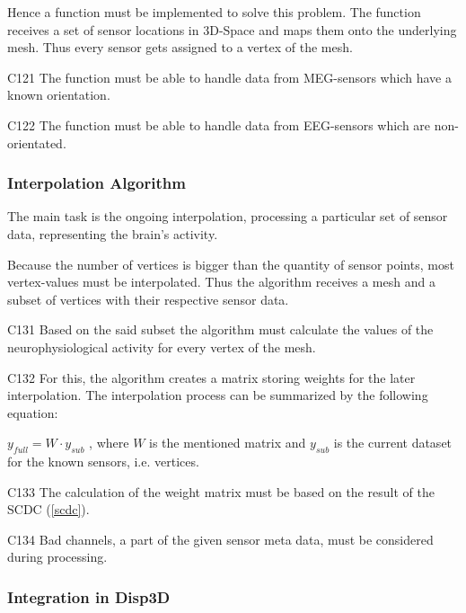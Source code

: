 	Hence a function must be implemented to solve this problem. 
	The function receives a set of sensor locations in 3D-Space and maps them onto the underlying mesh. Thus every 			sensor gets assigned to a vertex of the mesh. 

	\begin{aims}
	
		\item[C121] The function must be able to handle data from MEG-sensors which have a known orientation.
		\item[C122] The function must be able to handle data from EEG-sensors which are non-orientated.
	
	\end{aims}

\subsubsection{Interpolation Algorithm} \label{interpolation} 

	The main task is the ongoing interpolation, processing a particular set of sensor data, representing the brain's 			activity.
	
	Because the number of vertices is bigger than the quantity of sensor points, most vertex-values must be interpolated.
	Thus the algorithm receives a mesh and a subset of vertices with their respective sensor data.  
	
	\begin{aims}
	
		\item[C131] Based on the said subset the algorithm must calculate the values of the neurophysiological activity for every vertex of the mesh.
		\item[C132] For this, the algorithm creates a matrix storing weights for the later interpolation.
					The interpolation process can be summarized by the following equation: 
					
					$y_{full} = W \cdot y_{sub}$
					, where $W$ is the mentioned matrix and $y_{sub}$ is the current dataset for the known sensors, i.e. 							vertices.
		\item[C133] The calculation of the weight matrix must be based on the result of the SCDC (\ref{scdc}).
		\item[C134] Bad channels, a part of the given sensor meta data, must be considered during processing. 
	
	\end{aims}

\subsubsection{Integration in Disp3D} \label{integration}
	
